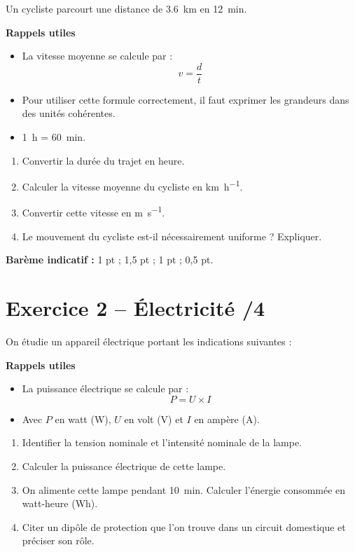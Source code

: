 \documentclass[11pt,a4paper]{article}
\begin{document}
Un cycliste parcourt une distance de \SI{3,6}{km} en \SI{12}{min}.

\textbf{Rappels utiles}
\begin{itemize}[leftmargin=1.2cm]
    \item La vitesse moyenne se calcule par :
    \[
    v=\frac{d}{t}
    \]
    \item Pour utiliser cette formule correctement, il faut exprimer les grandeurs dans des unités cohérentes.
    \item \SI{1}{h} = \SI{60}{min}.
\end{itemize}

\begin{enumerate}
    \item Convertir la durée du trajet en heure.
    \item Calculer la vitesse moyenne du cycliste en \si{km.h^{-1}}.
    \item Convertir cette vitesse en \si{m.s^{-1}}.
    \item Le mouvement du cycliste est-il nécessairement uniforme ? Expliquer.
\end{enumerate}

\textbf{Barème indicatif :} 1 pt ; 1,5 pt ; 1 pt ; 0,5 pt.

\section*{Exercice 2 -- Électricité \hfill /4}

On étudie un appareil électrique portant les indications suivantes :

\begin{center}
\end{center}

\textbf{Rappels utiles}
\begin{itemize}[leftmargin=1.2cm]
    \item La puissance électrique se calcule par :
    \[
    P=U\times I
    \]
    \item Avec \(P\) en watt (W), \(U\) en volt (V) et \(I\) en ampère (A).
\end{itemize}

\begin{enumerate}
    \item Identifier la tension nominale et l’intensité nominale de la lampe.
    \item Calculer la puissance électrique de cette lampe.
    \item On alimente cette lampe pendant \SI{10}{min}. Calculer l’énergie consommée en watt-heure (\si{Wh}).
    \item Citer un dipôle de protection que l’on trouve dans un circuit domestique et préciser son rôle.
\end{enumerate}
\end{document}
